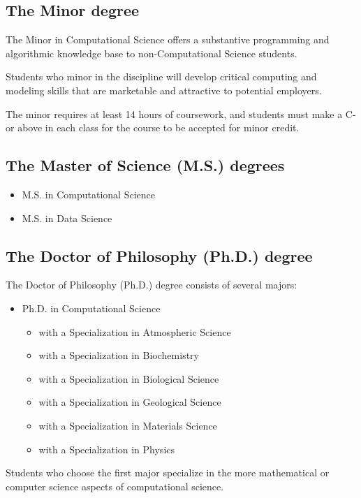 \documentclass[12pt,a4paper]{article}
\begin{document}
\subsection{The Minor degree}
The Minor in Computational Science offers a substantive programming and algorithmic knowledge base to non-Computational Science students.

Students who minor in the discipline will develop critical computing and modeling skills that are marketable and attractive to potential employers.

The minor requires at least 14 hours of coursework, and students must make a C- or above in each class for the course to be accepted for minor credit.

\subsection{The Master of Science (M.S.) degrees}
\begin{itemize}
    \item M.S. in Computational Science
    \item M.S. in Data Science
\end{itemize}

\subsection{The Doctor of Philosophy (Ph.D.) degree}
The Doctor of Philosophy (Ph.D.) degree consists of several majors:
\begin{itemize}
    \item Ph.D. in Computational Science
    \begin{itemize}
        \item with a Specialization in Atmospheric Science
        \item with a Specialization in Biochemistry
        \item with a Specialization in Biological Science
        \item with a Specialization in Geological Science
        \item with a Specialization in Materials Science
        \item with a Specialization in Physics
    \end{itemize}
\end{itemize}
Students who choose the first major specialize in the more mathematical or computer science aspects of computational science.
\end{document}
